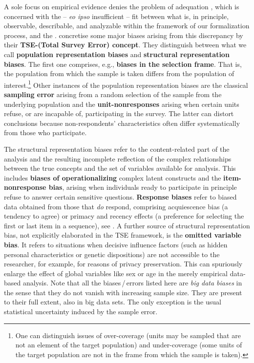\documentclass{article}
\theoremstyle{plain}
\theoremstyle{definition}
\theoremstyle{remark}
\begin{document}
A sole focus on empirical evidence denies the problem of adequation \citep{Menges:Adaequation:1982,Grohmann:Method:2000}, which is concerned with the -- \textit{eo ipso} insufficient -- fit between what is, in principle, observable, describable, and analyzable within the framework of our formalization process, and the . \citet{Groves:Lyberg:TSE:2010} concretise some major biases arising from this discrepancy by their \textbf{TSE-(Total Survey Error) concept}. They distinguish between what we call \textbf{population representation biases} and \textbf{structural representation biases}. The first one comprises, e.g., \textbf{biases in the selection frame}. That is, the population from which the sample is taken differs from the population of interest.\footnote{One can distinguish issues of over-coverage (units may be sampled that are not an element of the target population) and under-coverage (some units of the target population are not in the frame from which the sample is taken).} 
Other instances of the population representation biases are the classical \textbf{sampling error} arising from a random selection of the sample from the underlying population and the \textbf{unit-nonresponses} arising when certain units refuse, or are incapable of, participating in the survey. The latter can distort conclusions because non-respondents' characteristics often differ systematically from those who participate. 

The structural representation biases refer to the content-related part of the analysis and the resulting incomplete reflection of the complex relationships between the true concepts and the set of variables available for analysis. This includes \textbf{biases of operationalizing} complex latent constructs %
and the \textbf{item-nonresponse bias}, arising when individuals ready to participate in principle refuse to answer certain sensitive questions. \textbf{Response biases} refer to biased data obtained from those that \textit{do} respond, comprising acquiescence bias (a tendency to agree) or primacy and recency effects (a preference for selecting the first or last item in a sequence), see \citet{kaufmann2023challenges}. 
%
A further source of structural representation bias, not explicitly elaborated in the TSE framework, is the \textbf{omitted variable bias}. It refers to situations when decisive influence factors (such as hidden personal characteristics or genetic dispositions) are not accessible to the researcher, for example, for reasons of privacy preservation. This can spuriously enlarge the effect of global variables like sex or age in the merely empirical data-based analysis. 
%
Note that all the biases\,/\,errors listed here are \textit{big data biases} in the sense that they do not vanish with increasing sample size. They are present to their full extent, also in big data sets. The only exception is the usual statistical uncertainty induced by the sample error.   
\end{document}
